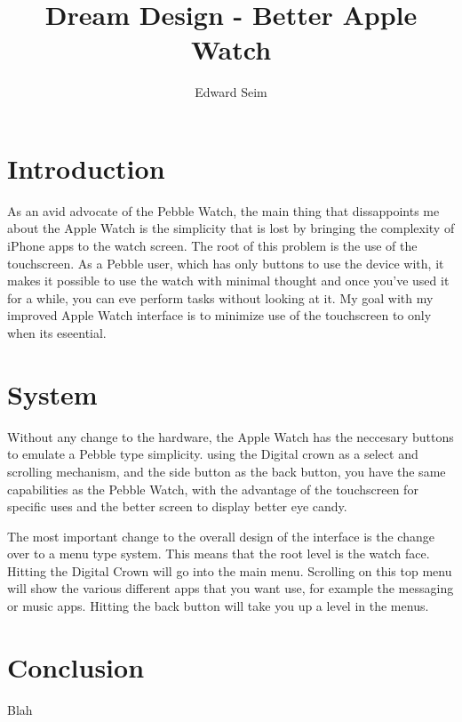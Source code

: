 \documentclass[journal,letterpaper]{article}
\title{Dream Design - Better Apple Watch}
\author{Edward Seim}
\begin{document}
    \maketitle
    
    \section{Introduction}
    \label{Introduction}

    As an avid advocate of the Pebble Watch, the main thing that dissappoints me about the Apple Watch is the simplicity that is lost by bringing the complexity of iPhone apps to the watch screen. The root of this problem is the use of the touchscreen. As a Pebble user, which has only buttons to use the device with, it makes it possible to use the watch with minimal thought and once you've used it for a while, you can eve perform tasks without looking at it. My goal with my improved Apple Watch interface is to minimize use of the touchscreen to only when its eseential. 

    \section{System}
    \label{System}

    Without any change to the hardware, the Apple Watch has the neccesary buttons to emulate a Pebble type simplicity. using the Digital crown as a select and scrolling mechanism, and the side button as the back button, you have the same capabilities as the Pebble Watch, with the advantage of the touchscreen for specific uses and the better screen to display better eye candy.

    The most important change to the overall design of the interface is the change over to a menu type system. This means that the root level is the watch face. Hitting the Digital Crown will go into the main menu. Scrolling on this top menu will show the various different apps that you want use, for example the messaging or music apps. Hitting the back button will take you up a level in the menus. 

    \section{Conclusion}
    \label{Conclusion}

    Blah
\end{document}
